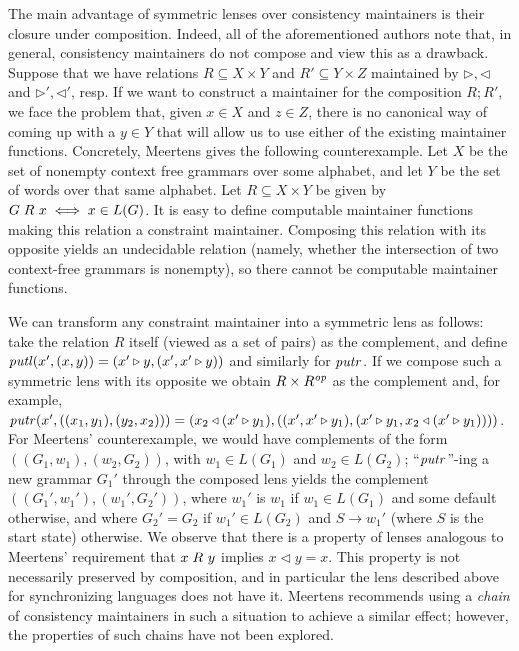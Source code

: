 The main advantage of symmetric lenses over consistency maintainers is
their closure under composition. Indeed, all of the aforementioned
authors note that, in general, consistency maintainers do not compose
and view this as a drawback.
%
Suppose that we have relations $R\subseteq X\times Y$ and
$R'\subseteq Y\times Z$ maintained by $\triangleright,\triangleleft$
and $\triangleright', \triangleleft'$, resp. If we want to construct a
maintainer for the composition $R;R'$, we face the problem that, given
$x\in X$ and $z\in Z$, there is no canonical way of coming up with a
$y\in Y$ that will allow us to use either of the existing maintainer
functions. Concretely, Meertens gives the following counterexample.
Let $X$ be the set of nonempty context free grammars over some alphabet, and let
$Y$ be the set of words over that same alphabet. Let $R\subseteq
X\times Y$ be given by $G \mathrel{R_{}} x\iff x\in L(G)$. It is easy to define
computable maintainer functions making this relation a constraint
maintainer. Composing this relation with its opposite yields an
undecidable relation (namely, whether the intersection of two context-free
grammars is nonempty), so there cannot be computable maintainer functions.

We can transform any constraint maintainer into a  symmetric lens as
follows: take the relation $R$ itself (viewed as a set of pairs) as
the complement, and define $\mathit{putl}(x',(x,y))=(x'\triangleright
y,(x',x'\triangleright y))$ and similarly
for $\mathit{putr}$. If we compose such a symmetric lens with its opposite
we obtain $R\times R^\mathit{op}$ as the complement and, for example,
$\mathit{putr}(x',((x_1,y_1),(y_2,x_2))) =
(x_2\triangleleft(x'\triangleright y_1), ((x',x'\triangleright
y_1),(x'\triangleright y_1,x_2\triangleleft(x'\triangleright y_1))))$.
%
For Meertens' counterexample, we would have complements of the form
$((G_1,w_1),(w_2,G_2))$, with $w_1\in L(G_1)$
and $w_2\in L(G_2)$; ``$\mathit{putr}$''-ing a new grammar
$G_1'$ through the composed lens yields the complement
$((G_1',w_1'),(w_1',G_2'))$, where $w_1'$ is $w_1$ if $w_1\in L(G_1)$ and
some default otherwise, and where $G_2'=G_2$ if $w_1'\in L(G_2)$ and
$S{\rightarrow}w_1'$ (where $S$ is the start state) otherwise. We observe
that there is a property of lenses analogous to Meertens' requirement that
$x \mathrel{R_{}} y$ implies $x \triangleleft y = x$. This property is not
necessarily preserved by composition, and in particular the lens described
above for synchronizing languages does not have it.
%
Meertens recommends using a {\em chain} of consistency maintainers in such a
situation to achieve a similar effect; however, the properties of such
chains have not been explored.

